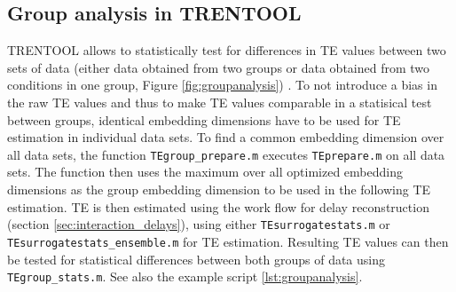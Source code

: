 \documentclass[a4paper,10pt]{article}
\begin{document}
\subsection{Group analysis in TRENTOOL} \label{sec:groupanalysis}

TRENTOOL allows to statistically test for differences in TE values between two sets of data (either data obtained from two groups or data obtained from two conditions in one group, Figure \ref{fig:groupanalysis}) \cite{lindner2011}. To not introduce a bias in the raw TE values and thus to make TE values comparable in a statisical test between groups, identical embedding dimensions have to be used for TE estimation in individual data sets. To find a common embedding dimension over all data sets, the function \verb&TEgroup_prepare.m& executes \verb&TEprepare.m& on all data sets. The function then uses the maximum over all optimized embedding dimensions as the group embedding dimension to be used in the following TE estimation. TE is then estimated using the work flow for delay reconstruction (section \ref{sec:interaction_delays}), using either \verb&TEsurrogatestats.m& or \verb&TEsurrogatestats_ensemble.m& for TE estimation. Resulting TE values can then be tested for statistical differences between both groups of data using \verb&TEgroup_stats.m&. See also the example script \ref{lst:groupanalysis}.
\end{document}
